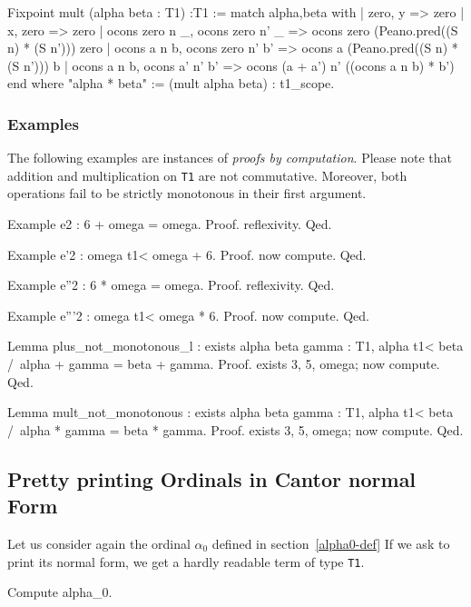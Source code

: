 \documentclass[a4paper]{book}
\begin{document}
\begin{Coqsrc}
Fixpoint mult (alpha beta : T1) :T1 :=
  match alpha,beta with
 |  zero, y  => zero
 |  x, zero => zero
 |  ocons zero n _, ocons zero n' _ => 
                 ocons zero (Peano.pred((S n) * (S n'))) zero
 |  ocons a n b, ocons zero n' b' =>  
                 ocons a (Peano.pred((S n) * (S n'))) b
 |  ocons a n b, ocons a' n' b' =>
     ocons (a + a') n' ((ocons a n b) * b')
 end
where  "alpha * beta" := (mult alpha beta) : t1_scope.
\end{Coqsrc}


\subsubsection{Examples}

The following examples are instances of \emph{proofs by computation}. Please note that  addition and multiplication on \texttt{T1}
are not commutative. Moreover,  both operations fail to be strictly monotonous in their first argument.


\begin{Coqsrc}
Example e2 : 6 + omega = omega.
Proof. reflexivity. Qed.

Example e'2 : omega t1< omega + 6.
Proof. now compute. Qed.

Example e''2 : 6 * omega = omega.
Proof. reflexivity. Qed.

Example e'''2 : omega t1< omega * 6.
Proof. now compute. Qed.
\end{Coqsrc}

\begin{Coqsrc}
Lemma plus_not_monotonous_l : exists alpha beta gamma : T1,
    alpha t1< beta /\ alpha + gamma = beta + gamma.
Proof.
  exists 3, 5, omega;  now  compute.
Qed.

Lemma mult_not_monotonous :  exists alpha beta gamma : T1,
      alpha t1< beta /\ alpha * gamma = beta * gamma.
Proof.
  exists 3, 5, omega; now compute.
Qed.
\end{Coqsrc}


\subsection{Pretty printing Ordinals in Cantor normal Form}

Let us consider again the ordinal $\alpha_0$ defined in section~\vref{alpha0-def}
If we ask \coq{} to print its  normal form, we get a hardly readable term of type \texttt{T1}.

\begin{Coqsrc}
Compute alpha_0.
\end{Coqsrc}
\end{document}
